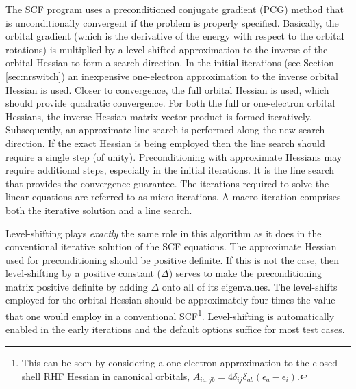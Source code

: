 
The SCF program uses a preconditioned conjugate gradient (PCG) method 
that is unconditionally convergent if the problem is properly specified.  
Basically, the orbital gradient (which is the derivative of the energy 
with respect to the orbital rotations) is multiplied by a
level-shifted approximation to the inverse of the orbital Hessian to
form a search direction.  In the initial iterations (see Section
\ref{sec:nrswitch}) an inexpensive one-electron approximation to the
inverse orbital Hessian is used.  Closer to convergence, the full
orbital Hessian is used, which should provide quadratic convergence.
For both the full or one-electron orbital Hessians, the
inverse-Hessian matrix-vector product is formed iteratively.
Subsequently, an approximate line search is performed along the new
search direction.  If the exact Hessian is being employed then the
line search should require a single step (of unity).  Preconditioning
with approximate Hessians may require additional steps, especially in
the initial iterations.  It is the line search that provides the
convergence guarantee.  The iterations required to solve the linear
equations are referred to as micro-iterations.  A macro-iteration
comprises both the iterative solution and a line search.

  Level-shifting plays {\em exactly} the same role in this algorithm
as it does in the conventional iterative solution of the SCF
equations.  The approximate Hessian used for preconditioning should be
positive definite.  If this is not the case, then level-shifting by a
positive constant ($\Delta$) serves to make the preconditioning matrix
positive definite by adding $\Delta$ onto all of its eigenvalues.  The
level-shifts employed for the orbital Hessian should be approximately
four times the value that one would employ in a conventional
SCF\footnote{This can be seen by considering a one-electron
approximation to the closed-shell RHF Hessian in canonical orbitals,
$A_{ia,jb} = 4 \delta_{ij} \delta_{ab} (\epsilon_a - \epsilon_i)$.}.
Level-shifting is automatically enabled in the early iterations and
the default options suffice for most test cases.

